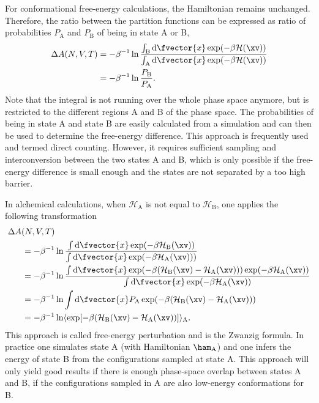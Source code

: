 %
For conformational free-energy calculations, the Hamiltonian remains unchanged. Therefore, the ratio between the partition 
functions
can be expressed as ratio of probabilities $P_{\mathrm{A}}$ and $P_{\mathrm{B}}$ of being in state A
or B,
\begin{align}
    \Delta A(N,V,T)&=  -\beta^{-1} \ln   \frac{\int_{\mathrm{B}} \mathrm{d}\fvector{x} \exp(-\beta\mathcal{H}(\xv))}{\int_{\mathrm{A}} \mathrm{d}\fvector{x} \exp(-\beta\mathcal{H}(\xv))} \nonumber \\
                &= -\beta^{-1} \ln   \frac{P_{\mathrm{B}}}{P_{\mathrm{A}}}.
\end{align}
%
%
Note that the integral is not running over the whole phase space anymore, but is restricted to the different regions 
A and B of the phase space. The probabilities of being in state A and state B are easily
calculated from a simulation and can then be used to determine
the free-energy difference. This approach is frequently used
and termed direct counting. However, it requires sufficient
sampling and interconversion between the two states A and B,
which is only possible if the free-energy difference is small
enough and the states are not separated by a too high barrier.

In alchemical calculations, when $\mathcal{H}_{\mathrm{A}}$ is not 
equal  to $\mathcal{H}_{\mathrm{B}}$, one applies the following 
transformation
%
\begin{equation}
\begin{split}
    \Delta A(N,V,T)& \\        
    = -\beta^{-1} &\ln   \frac{\int \mathrm{d}\fvector{x} \exp(-\beta\mathcal{H}_\mathrm{B}(\xv))}{\int \mathrm{d}\fvector{x} \exp(-\beta\mathcal{H}_{\mathrm{A}}(\xv)))}  \\
=  -\beta^{-1} &\ln   \frac{\int \mathrm{d}\fvector{x}  \exp(-\beta(\mathcal{H}_{\mathrm{B}}(\xv)-\mathcal{H}_{\mathrm{A}}(\xv))) \exp(-\beta\mathcal{H}_{\mathrm{A}}(\xv))}{\int \mathrm{d}\fvector{x} \exp(-\beta\mathcal{H}_{\mathrm{A}}(\xv))}  \\
=  -\beta^{-1} &\ln   \int \mathrm{d}\fvector{x}  P_{\mathrm{A}}\exp(-\beta(\mathcal{H}_\mathrm{B}(\xv)-\mathcal{H}_{\mathrm{A}}(\xv)))   \\
=  -\beta^{-1} &\ln \langle \exp [-\beta(\mathcal{H}_{\mathrm{B}}(\xv)-\mathcal{H}_{\mathrm{A}}(\xv))] \rangle_{\mathrm{A}} .
\label{eq:zwanzig}
\end{split}
\end{equation}
%
This approach is called free-energy perturbation and  is the Zwanzig formula\cite{ZW54.1}. In practice one simulates state A (with Hamiltonian $\ham_{\mathrm{A}}$) and one 
infers the energy of state B
from the configurations sampled at state A. This approach will only yield good results if there is enough phase-space overlap between states A and B, \ie{} if the configurations sampled in 
A are also low-energy conformations for B.


